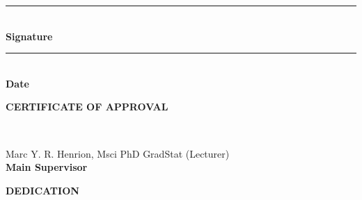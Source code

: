 \documentclass[a4paper]{thesis}
\begin{document}
\par \bigskip \bigskip \bigskip

\begin{center}
\rule{10cm}{0.2mm}\\
\bf{Signature}
\end{center}




\par \bigskip \bigskip \bigskip

\begin{center}
\rule{10cm}{0.2mm}\\
\bf{Date}
\end{center}

\newpage


\thispagestyle{empty}


\begin{large}
\begin{center}
\bf{CERTIFICATE OF APPROVAL}\\
\end{center} 
\end{large}

\par

\begin{flushleft}
\\
\end{flushleft}


Marc Y. R. Henrion, Msci PhD GradStat (Lecturer)\\
\bf{Main Supervisor}

\newpage

\thispagestyle{empty}


\begin{large}
\begin{center}
\bf{DEDICATION}\\
\end{center}
\end{large}

\par \bigskip
\end{document}
